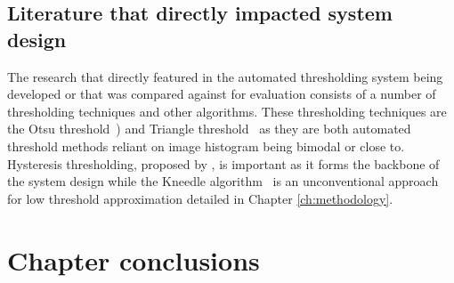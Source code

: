 \subsection*{Literature that directly impacted system design}
The research that directly featured in the automated thresholding system being developed or that was compared against for evaluation consists of a number of thresholding techniques and other algorithms. These thresholding techniques are the Otsu threshold~\cite{Otsu1979ATS}) and Triangle threshold~\cite{triangleThresh} as they are both automated threshold methods reliant on image histogram being bimodal or close to. Hysteresis thresholding, proposed by \cite{Hysteresis}, is important as it forms the backbone of the system design while the Kneedle algorithm~\cite{kneedle_paper} is an unconventional approach for low threshold approximation detailed in Chapter \ref{ch:methodology}.  

\section{Chapter conclusions}

